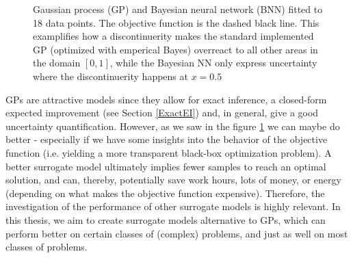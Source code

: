 \begin{figure}[H]%
    \centering
    \qquad
    \caption{Gaussian process (GP) and Bayesian neural network (BNN) fitted to 18 data points. The objective function is the
    dashed black line. This examplifies how a discontinuerity makes the standard implemented GP
    (optimized with emperical Bayes) overreact to all other areas in the domain $[0,1]$, while the
    Bayesian NN only express uncertainty where the discontinuerity happens at $x =
    0.5$}\label{GP_vs_BNN}
\end{figure}



GPs are attractive models since they allow for exact inference, a closed-form expected improvement
 (see Section \ref{ExactEI}) and, in general, give a good uncertainty quantification. However, as we
 saw in the figure \ref{GP_vs_BNN} we can maybe do better - especially if we have some insights into
 the behavior of the objective function (i.e. yielding a more transparent black-box optimization
 problem). A better surrogate model ultimately implies fewer samples to reach an optimal solution,
 and can, thereby, potentially save work hours, lots of money, or energy (depending on what makes
 the objective function expensive).  Therefore, the investigation of the performance of other
 surrogate models is highly relevant. In this thesis, we aim to create surrogate models alternative
 to GPs, which can perform better on certain classes of (complex) problems, and just as well on most
 classes of problems. 

